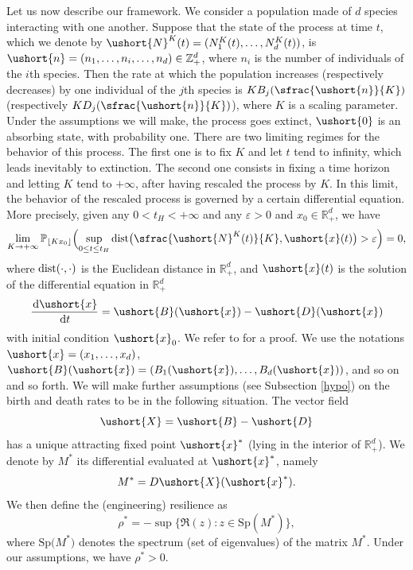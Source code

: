 \documentclass[10pt]{amsart}
\numberwithin{equation}{section}
\theoremstyle{plain}
\theoremstyle{definition}
\newcommand{\proba}{{\mathbb{P}}}
\newcommand{\zentiers}{{\mathbb{Z}}}
\newcommand{\domaine}{\zentiers_{+}^{d}}
\newcommand{\rpd}{\mathbb{R}_+^d}
\newcommand{\sK}{K}
\newcommand{\Sp}{\mathrm{Sp}}
\newcommand{\vecn}{\ushort{n}}
\newcommand{\vecxf}{\ushort{x}^*}
\newcommand{\vecx}{\ushort{x}}
\newcommand{\vecX}{\ushort{X}}
\newcommand{\vecB}{\ushort{B}}
\newcommand{\vecD}{\ushort{D}}
\newcommand{\veczer}{\ushort{0}}
\newcommand{\res}{\rho^*}
\newcommand{\leproc}{\ushort{N}^{K}}
\newcommand{\dd}{\hspace{1pt}\mathrm{d}}
\begin{document}
Let us now describe our framework. We consider a population made of $d$ species interacting with one another. Suppose that the state of the
process at time $t$, which we denote by $\leproc(t)=(N_1^{\sK}(t), \ldots,N_d^{\sK}(t))$, is $\vecn=(n_1,
\ldots,n_i,\ldots,n_d) \in\domaine$, where $n_i$ is the number of individuals of the $i$th species. Then the rate at which the population increases
(respectively decreases) by one individual of the $j$th species is $KB_j(\sfrac{\vecn}{K})$ (respectively $K
D_j(\sfrac{\vecn}{K})$), where $K$ is a scaling parameter.
Under the assumptions we will make, the process goes extinct, \ie $\veczer$ is an absorbing state, with probability one.
There are two limiting regimes for the behavior of this process.
The first one is to fix $K$ and let $t$ tend to infinity, which leads inevitably to extinction.
The second one consists in fixing a time horizon and letting $K$ tend to $+\infty$, after having rescaled the process
by $K$. In this limit, the behavior of the rescaled process is governed by a certain differential equation.
More precisely, given any $0<t_H<+\infty$ and any $\varepsilon>0$ and $x_{0}\in \rpd$, we have
\[
\lim_{K\to+\infty} \proba_{\lfloor \sK x_{0}\rfloor}
\Bigl(\sup_{0\leq t\leq t_H}\textup{dist}\bigl(\sfrac{\leproc(t)}{K},\vecx(t)\bigr)>\varepsilon \Bigr)=0,
\]
where $\textup{dist}(\cdot,\cdot)$ is the Euclidean distance in $\rpd$, and $\vecx(t)$ is the solution of the differential equation in $\rpd$
\[
\frac{\dd\vecx}{\dd t}=\vecB(\vecx)-\vecD(\vecx)
\]
with initial condition $\vecx_0$. We refer to \cite[Chap.\,11]{EK} for a proof.
We use the notations $\vecx=(x_1,\ldots,x_d)$, $\vecB(\vecx)=(B_1(\vecx),\ldots,B_d(\vecx))$,
and so on and so forth. We will make further assumptions (see Subsection \ref{hypo}) on the birth and death rates to be in the following
situation.
The vector field
\[
\vecX=\vecB-\vecD
\]
has a unique attracting fixed point $\vecxf$ (lying in the interior of $\rpd$). We denote by $M^*$ its differential evaluated at
$\vecxf$, namely
\[
M^*=D\vecX(\vecxf).
\]
We then define the (engineering) resilience as
\[
\res= - \sup\{ \Re (z): z\in\Sp(M^*)\},
\]
where $\Sp\bigl(M^*\bigr)$ denotes the spectrum (set of eigenvalues) of the matrix $M^*$.
Under our assumptions, we have $\res>0$.
\end{document}

